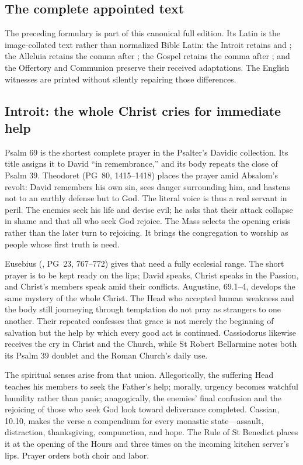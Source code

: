 \subsection*{The complete appointed text}

The preceding formulary is part of this canonical full edition. Its Latin is
the image-collated text rather than normalized Bible Latin: the Introit retains
 and ; the Alleluia retains the comma after
; the Gospel retains the comma after ; and
the Offertory and Communion preserve their received adaptations. The English
witnesses are printed without silently repairing those differences.

\elementguard
\subsection*{Introit: the whole Christ cries for immediate help }

Psalm 69 is the shortest complete prayer in the Psalter's Davidic collection.
Its title assigns it to David ``in remembrance,'' and its body repeats the
close of Psalm 39. Theodoret (PG~80, 1415--1418) places the prayer amid
Absalom's revolt: David remembers his own sin, sees danger surrounding him,
and hastens not to an earthly defense but to God. The literal voice is thus a
real servant in peril. The enemies seek his life and devise evil; he asks that
their attack collapse in shame and that all who seek God rejoice. The Mass
selects the opening crisis rather than the later turn to rejoicing. It brings
the congregation to worship as people whose first truth is need.

Eusebius (, PG~23, 767--772) gives that need a
fully ecclesial range. The short prayer is to be kept ready on the lips; David
speaks, Christ speaks in the Passion, and Christ's members speak amid their
conflicts. Augustine,  69.1--4, develops the same
mystery of the whole Christ. The Head who accepted human weakness and the body
still journeying through temptation do not pray as strangers to one another.
Their repeated  confesses that grace is
not merely the beginning of salvation but the help by which every good act is
continued. Cassiodorus likewise receives the cry in Christ and the Church,
while St Robert Bellarmine notes both its Psalm 39 doublet and the Roman
Church's daily use.

The spiritual senses arise from that union. Allegorically, the suffering Head
teaches his members to seek the Father's help; morally, urgency becomes
watchful humility rather than panic; anagogically, the enemies' final confusion
and the rejoicing of those who seek God look toward deliverance completed.
Cassian,  10.10, makes the verse a compendium for every
monastic state---assault, distraction, thanksgiving, compunction, and hope.
The Rule of St Benedict places it at the opening of the Hours and three times
on the incoming kitchen server's lips. Prayer orders both choir and labor.

